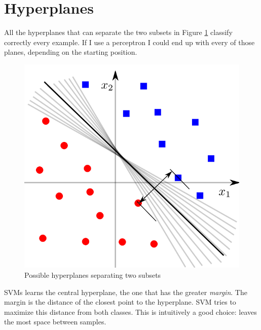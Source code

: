 \section{Hyperplanes}
    All the hyperplanes that can separate the two subsets in Figure \ref{fig:hyperplanesSVMs} classify correctly every example. If I use a perceptron I could end up with every of those planes, depending on the starting position. 
    \begin{figure}[ht]
        \centering
        \includegraphics[scale=0.3]{images/hyperplanes_SVMs.png}
        \caption{Possible hyperplanes separating two subsets}
        \label{fig:hyperplanesSVMs}
    \end{figure}
    SVMs learns the central hyperplane, the one that has the greater \textit{margin}. The margin is the distance  of the closest point to the hyperplane. SVM tries to maximize this distance from both classes.
    This is intuitively a good choice: leaves the most space between samples.
    

